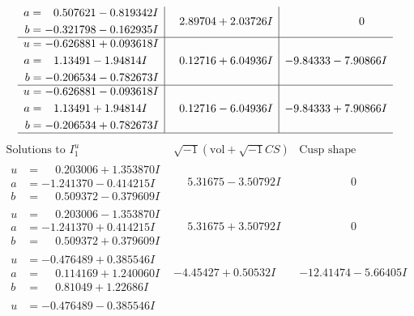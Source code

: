 \documentclass[1p]{elsarticle_modified}
\theoremstyle{definition}
\newcommand{\I}{\sqrt{-1}}
\begin{document}
$$\begin{array}{c|c|c}
\begin{aligned}
a &= \phantom{-}0.507621 - 0.819342 I \\
b &= -0.321798 - 0.162935 I\end{aligned}
 & \phantom{-}2.89704 + 2.03726 I & \phantom{-0.000000 } 0 \\ \hline\begin{aligned}
u &= -0.626881 + 0.093618 I \\
a &= \phantom{-}1.13491 - 1.94814 I \\
b &= -0.206534 - 0.782673 I\end{aligned}
 & \phantom{-}0.12716 + 6.04936 I & -9.84333 - 7.90866 I \\ \hline\begin{aligned}
u &= -0.626881 - 0.093618 I \\
a &= \phantom{-}1.13491 + 1.94814 I \\
b &= -0.206534 + 0.782673 I\end{aligned}
 & \phantom{-}0.12716 - 6.04936 I & -9.84333 + 7.90866 I\\
 \hline 
 \end{array}$$\newpage$$\begin{array}{c|c|c}  
\text{Solutions to }I^u_{1}& \I (\text{vol} + \sqrt{-1}CS) & \text{Cusp shape}\\
 \hline 
\begin{aligned}
u &= \phantom{-}0.203006 + 1.353870 I \\
a &= -1.241370 - 0.414215 I \\
b &= \phantom{-}0.509372 - 0.379609 I\end{aligned}
 & \phantom{-}5.31675 - 3.50792 I & \phantom{-0.000000 } 0 \\ \hline\begin{aligned}
u &= \phantom{-}0.203006 - 1.353870 I \\
a &= -1.241370 + 0.414215 I \\
b &= \phantom{-}0.509372 + 0.379609 I\end{aligned}
 & \phantom{-}5.31675 + 3.50792 I & \phantom{-0.000000 } 0 \\ \hline\begin{aligned}
u &= -0.476489 + 0.385546 I \\
a &= \phantom{-}0.114169 + 1.240060 I \\
b &= \phantom{-}0.81049 + 1.22686 I\end{aligned}
 & -4.45427 + 0.50532 I & -12.41474 - 5.66405 I \\ \hline\begin{aligned}
u &= -0.476489 - 0.385546 I \\

\end{aligned}
\end{array}$$
\end{document}
